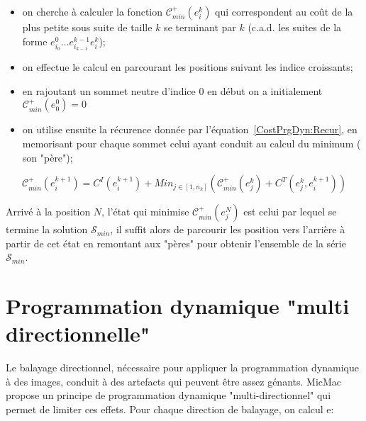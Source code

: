 {\begin{itemize}

\label{Def:CPlusMin}
   \item on cherche \`a calculer la fonction $ \mathcal C^+_{min} (e^k_i)$
   qui correspondent au co\^ut de la plus petite sous suite de
   taille $k$ se  terminant par $k$ (c.a.d.  les suites
   de la forme $e^0_{i_0} \dots e^{k-1}_{i_{k-1}} e^k_i$);

   \item on effectue le calcul en parcourant les positions
         suivant les indice croissants;

   \item  en rajoutant un sommet neutre d'indice $0$ en d\'ebut on a
          initialement  $ \mathcal C^+_{min} (e^0_0) = 0$

   \item on utilise ensuite la r\'ecurence donn\'ee par
         l'\'equation~\ref{CostPrgDyn:Recur}, en memorisant
         pour chaque sommet celui ayant conduit au calcul
         du minimum ( son "p\`ere");

\end{itemize}

\begin{equation}
\label{CostPrgDyn:Recur}
 \mathcal C^+_{min} (e^{k+1}_i) =  C^I(e^{k+1}_i)+Min_{j\in[1,n_k]}(
             \mathcal  C^+_{min} (e^k_j) +  C^T(e^k_j,e^{k+1}_i)
 )
\end{equation}

Arriv\'e  \`a la position $N$, l'\'etat qui minimise $\mathcal  C^+_{min} (e^N_j) $
est celui par lequel se termine  la solution $\mathcal S_{min} $, il
suffit alors de parcourir les position vers l'arri\`ere \`a partir de cet
\'etat en remontant aux "p\`eres" pour obtenir l'ensemble de  la
s\'erie $\mathcal S_{min} $.



\section{Programmation dynamique "multi directionnelle"}

\label{ProgDyn:MulDir}

Le balayage directionnel, n\'ecessaire pour appliquer la
programmation dynamique \`a des images, conduit \`a des
artefacts qui peuvent \^etre assez g\'enants.
MicMac propose un principe de programmation dynamique "multi-directionnel"
qui permet de limiter ces effets.
Pour chaque direction de balayage, on
calcul e:

}
